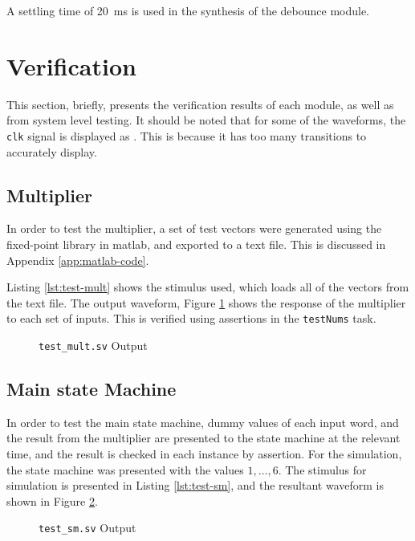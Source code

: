 A settling time of \SI{20}{\milli\second} is used in the synthesis of the debounce module.

\FloatBarrier
\section{Verification} \label{sec:verif}
This section, briefly, presents the verification results of each module, as well as from system level testing. It should be noted that for some of the waveforms, the \texttt{clk} signal is displayed as . This is because it has too many transitions to accurately display.

\FloatBarrier
\subsection{Multiplier} \label{sec:test-mult}
In order to test the multiplier, a set of test vectors were generated using the fixed-point library in \gls{matlab}, and exported to a text file. This is discussed in Appendix \ref{app:matlab-code}.

Listing \ref{lst:test-mult} shows the stimulus used, which loads all of the vectors from the text file. The output waveform, Figure \ref{fig:test-mult} shows the response of the multiplier to each set of inputs. This is verified using assertions in the \texttt{testNums} task.


\begin{figure}[ht]
	\centering
	
	\caption{\texttt{test\_mult.sv} Output}
	\label{fig:test-mult}
\end{figure}

\FloatBarrier
\subsection{Main state Machine}
In order to test the main state machine, dummy values of each input word, and the result from the multiplier are presented to the state machine at the relevant time, and the result is checked in each instance by assertion. For the simulation, the state machine was presented with the values $1,\dots,6$. The stimulus for simulation is presented in Listing \ref{lst:test-sm}, and the resultant waveform is shown in Figure \ref{fig:test-sm}.


\begin{figure}[ht]
	\centering
	
	\caption{\texttt{test\_sm.sv} Output}
	\label{fig:test-sm}
\end{figure}

